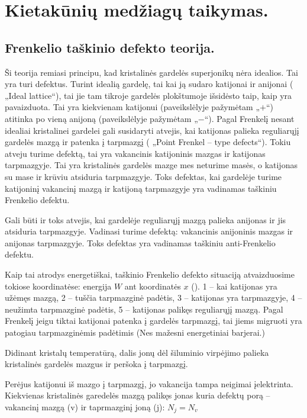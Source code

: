 \chapter{Kietakūnių medžiagų taikymas.}


\section{Frenkelio taškinio defekto teorija.}

Ši teorija remiasi principu, kad kristalinės gardelės superjonikų
nėra idealios. Tai yra turi defektus. Turint idealią gardelę, tai
kai ją sudaro katijonai ir anijonai ( „Ideal lattice“),
tai jie tam tikroje gardelės plokštumoje išsidėsto taip, kaip
yra pavaizduota. Tai yra kiekvienam katijonui (paveikslėlyje pažymėtam
„$+$“) atitinka po vieną anijoną (paveikslėlyje pažymėtam „$-$“).
Pagal Frenkelį nesant idealiai kristalinei gardelei
gali susidaryti atvejis, kai katijonas palieka reguliarųjį gardelės
mazgą ir patenka į tarpmazgį ( „Point Frenkel – type defects“). 
Tokiu atveju turime defektą, tai yra vakancinis katijoninis mazgas
ir katijonas tarpmazgyje. Tai yra kristalinės gardelės mazge mes
neturime masės, o katijonas su mase ir krūviu atsiduria tarpmazgyje.
Toks defektas, kai gardelėje turime katijoninį vakancinį mazgą
ir katijoną tarpmazgyje yra vadinamas taškiniu Frenkelio defektu.

Gali būti ir toks atvejis, kai gardelėje reguliarųjį mazgą palieka
anijonas ir jis atsiduria tarpmazgyje. Vadinasi turime defektą:
vakancinis anijoninis mazgas ir anijonas tarpmazgyje. Toks defektas
yra vadinamas taškiniu anti-Frenkelio defektu.

Kaip tai atrodys energetiškai, taškinio Frenkelio defekto situaciją
atvaizduosime tokiose koordinatėse: energija $W$ ant koordinatės $x$
(). 1 – kai katijonas yra užėmęs mazgą, 2 – tuščia
tarpmazginė padėtis, 3 – katijonas yra tarpmazgyje, 4 – neužimta
tarpmazginė padėtis, 5 – katijonas palikęs reguliarųjį mazgą.
Pagal Frenkelį jeigu tiktai katijonai patenka į gardelės tarpmazgį,
tai jiems migruoti yra patogiau tarpmazginėmis padėtimis (Nes
mažesni energetiniai barjerai.)

Didinant kristalų temperatūrą, dalis jonų dėl šiluminio virpėjimo
palieka kristalinės gardelės mazgus ir peršoka į tarpmazgį.

Perėjus katijonui iš mazgo į tarpmazgį, jo vakancija tampa neigimai
įelektrinta. Kiekvienas kristalinės garedelės mazgą palikęs jonas
kuria defektų porą -- vakancinį mazgą (v) ir taprmazginį joną (j):
$N_j = N_v$

